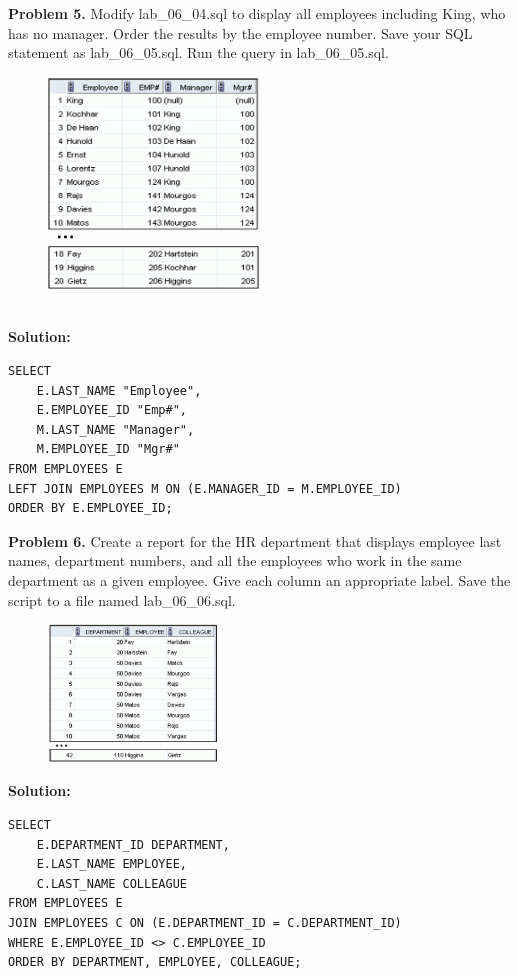 \documentclass[12pt,a4paper]{article}
\begin{document}
\vspace{0.5cm}

\textbf{Problem 5.} Modify lab\_06\_04.sql to display all employees including King, who has no manager. Order the results by the employee number. Save your SQL statement as lab\_06\_05.sql. Run the query in lab\_06\_05.sql.
\begin{figure}[htbp]
  \centering
  \includegraphics[width=0.5\textwidth]{Screenshots/65.png}
\end{figure}\\
\textbf{Solution:}
\begin{lstlisting}[style=sqlstyle]
SELECT 
    E.LAST_NAME "Employee",
    E.EMPLOYEE_ID "Emp#",
    M.LAST_NAME "Manager",
    M.EMPLOYEE_ID "Mgr#"
FROM EMPLOYEES E
LEFT JOIN EMPLOYEES M ON (E.MANAGER_ID = M.EMPLOYEE_ID)
ORDER BY E.EMPLOYEE_ID;
\end{lstlisting}

\vspace{0.5cm}

\textbf{Problem 6.} Create a report for the HR department that displays employee last names, department numbers, and all the employees who work in the same department as a given employee. Give each column an appropriate label. Save the script to a file named lab\_06\_06.sql.
\begin{figure}[htbp]
  \centering
  \includegraphics[width=0.4\textwidth]{Screenshots/66.png}
\end{figure}\newpage
\textbf{Solution:}
\begin{lstlisting}[style=sqlstyle]
SELECT 
    E.DEPARTMENT_ID DEPARTMENT,
    E.LAST_NAME EMPLOYEE,
    C.LAST_NAME COLLEAGUE
FROM EMPLOYEES E
JOIN EMPLOYEES C ON (E.DEPARTMENT_ID = C.DEPARTMENT_ID)
WHERE E.EMPLOYEE_ID <> C.EMPLOYEE_ID
ORDER BY DEPARTMENT, EMPLOYEE, COLLEAGUE;
\end{lstlisting}
\end{document}
